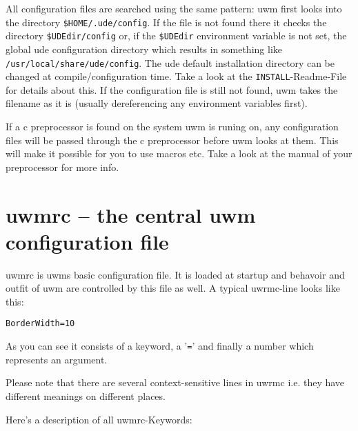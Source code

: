 \documentclass[10pt,a4paper]{article}
\newcommand{\uwm}{{\sc uwm} }
\newcommand{\ude}{{\sc ude} }
\begin{document}
All configuration files are searched using the same pattern: \uwm first looks into the directory \texttt{\$HOME/.ude/config}. If the file is not found there it checks the directory \texttt{\$UDEdir/config} or, if the \texttt{\$UDEdir} environment variable is not set, the global \ude configuration directory which results in something like \texttt{/usr/local/share/ude/config}. The \ude default installation directory can be changed at compile/configuration time. Take a look at the \texttt{INSTALL}-Readme-File for details about this. If the configuration file is still not found, \uwm takes the filename as it is (usually dereferencing any environment variables first).

If a c preprocessor is found on the system \uwm is runing on, any configuration files will be passed through the c preprocessor before \uwm looks at them. This will make it possible for you to use macros etc. Take a look at the manual of your preprocessor for more info.

\section{\textsf{uwmrc} -- the central \uwm configuration file}
\textsf{uwmrc} is uwms basic configuration file. It is loaded at startup and behavoir and outfit of \uwm are controlled by this file as well. A typical \textsf{uwrmc}-line looks like this:

\texttt{BorderWidth=10}

As you can see it consists of a keyword, a '\texttt{=}' and finally a number which represents an argument.

Please note that there are several context-sensitive lines in \textsf{uwrmc} i.e. they have different meanings on different places.

Here's a description of all \textsf{uwmrc}-Keywords:
\end{document}

